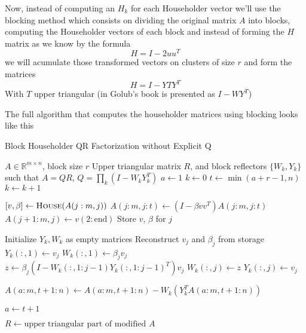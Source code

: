 \documentclass{scrartcl}
\begin{document}
Now, instead of computing an $H_k$ for each Householder vector we'll use the blocking method which consists on dividing the original matrix $A$ into blocks, computing the Householder vectors of each block and instead of forming the $H$ matrix as we know by the formula
\[
H = I - 2uu^T
\]
we will acumulate those transformed vectors on clusters of size $r$ and form the matrices
\[
H = I - YTY^T
\]
With $T$ upper triangular (in Golub's book is presented as $I - WY^T$)

The full algorithm that computes the householder matrices using blocking looks like this

\begin{algorithm}[H]
\caption{Block Householder QR Factorization without Explicit Q}
\begin{algorithmic}[0]
\REQUIRE $A \in \mathbb{R}^{m \times n}$, block size $r$
\ENSURE Upper triangular matrix $R$, and block reflectors $\{W_k, Y_k\}$ such that $A = QR$, $Q = \prod_k (I - W_k Y_k^T)$
\STATE $a \leftarrow 1$
\STATE $k \leftarrow 0$
    \STATE $t \leftarrow \min(a + r - 1, n)$
    \STATE $k \leftarrow k + 1$

        \STATE $[v, \beta] \leftarrow \textsc{House}(A(j:m, j))$
        \STATE $A(j:m, j:t) \leftarrow (I - \beta v v^T) A(j:m, j:t)$
            \STATE $A(j+1:m, j) \leftarrow v(2:\text{end})$
        \ENDIF
        \STATE Store $v$, $\beta$ for $j$
    \ENDFOR

    \STATE Initialize $Y_k, W_k$ as empty matrices
        \STATE Reconstruct $v_j$ and $\beta_j$ from storage
            \STATE $Y_k(:,1) \leftarrow v_j$
            \STATE $W_k(:,1) \leftarrow \beta_j v_j$
        \ELSE
            \STATE $z \leftarrow \beta_j (I - W_k(:,1:j-1) Y_k(:,1:j-1)^T) v_j$
            \STATE $W_k(:,j) \leftarrow z$
            \STATE $Y_k(:,j) \leftarrow v_j$
        \ENDIF
    \ENDFOR

    \STATE $A(a:m, t+1:n) \leftarrow A(a:m, t+1:n) - W_k (Y_k^T A(a:m, t+1:n))$

    \STATE $a \leftarrow t + 1$
\ENDWHILE

\STATE $R \leftarrow \text{upper triangular part of modified } A$
\end{algorithmic}
\end{algorithm}
\end{document}
